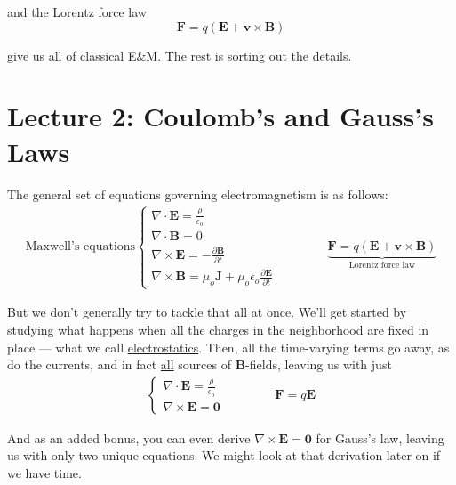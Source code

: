 \documentclass{article}
\numberwithin{equation}{section}
\begin{document}
and the Lorentz force law
\begin{equation*}
    \bm{F} = q\left( \bm{E} + \bm{v} \times \bm{B} \right)
\end{equation*}

give us all of classical E\&M. The rest is sorting out the details.

\newpage

\section*{Lecture 2: Coulomb's and Gauss's Laws}
\setcounter{page}{1}

The general set of equations governing electromagnetism is as follows:
\begin{gather*}
    \text{Maxwell's equations}\begin{cases} \displaystyle \nabla \cdot \bm{E} = \frac{\rho}{\epsilon_o} \\[0.4cm] \displaystyle \nabla \cdot \bm{B} = 0 \\[0.4cm] \displaystyle \nabla \times \bm{E} = -\frac{\partial \bm{B}}{\partial t} \\[0.4cm] \displaystyle \nabla \times \bm{B} = \mu_o \bm{J} + \mu_o\epsilon_o \frac{\partial \bm{E}}{\partial t} \end{cases} \qquad\qquad \underbrace{\bm{F} = q \left( \bm{E} + \bm{v} \times \bm{B} \right)}_{\displaystyle \text{Lorentz force law}}
\end{gather*}

But we don't generally try to tackle that all at once. We'll get started by studying what happens when all the charges in the neighborhood are fixed in place --- what we call \underline{electrostatics}. Then, all the time-varying terms go away, as do the currents, and in fact \underline{all} sources of $\bm{B}$-fields, leaving us with just
\begin{gather*}
    \begin{cases} \displaystyle \nabla \cdot \bm{E} = \frac{\rho}{\epsilon_o} \\[0.4cm] \displaystyle \nabla \times \bm{E} = \bm{0} \end{cases} \qquad\qquad \bm{F} = q\bm{E}
\end{gather*}

And as an added bonus, you can even derive $\displaystyle \nabla \times \bm{E} = \bm{0}$ for Gauss's law, leaving us with only two unique equations. We might look at that derivation later on if we have time.
\end{document}
